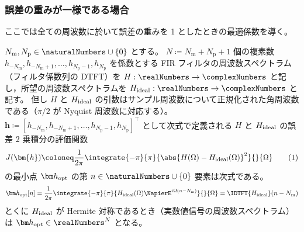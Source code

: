         \subsubsection{誤差の重みが一様である場合}
            \label{誤差の重みが一様である場合}
            \newcommand{\Nm}{{N_\text{m}}}
            \newcommand{\Np}{{N_\text{p}}}
            ここでは全ての周波数に於いて誤差の重みを 1 としたときの最適係数を導く。
            \begin{shadebox}
                $\Nm,\Np\in\naturalNumbers\cup\{0\}$ とする。
                $N\coloneq\Nm+\Np+1$ 個の複素数 $h_{-\Nm},h_{-\Nm+1},\dots,h_{\Np-1},h_\Np$ を係数とする FIR フィルタの周波数スペクトラム（フィルタ係数列の DTFT）を $H:\realNumbers\to\complexNumbers$ と記し，所望の周波数スペクトラムを $\Hideal:\realNumbers\to\complexNumbers$ と記す。
                但し $H$ と $H_\text{ideal}$ の引数はサンプル周波数について正規化された角周波数である（$\pi/2$ が Nyquist 周波数に対応する）。
                $\bm{h} \coloneq [h_{-\Nm},h_{-\Nm+1},\dots,h_{\Np-1},h_\Np]^\top$ として次式で定義される $H$ と $H_\text{ideal}$ の誤差 2 乗積分の評価関数
                \[ J(\bm{h}) \coloneq \frac{1}{2\pi}\integrate{-\pi}{\pi}{\abs{H(\Omega)-\Hideal(\Omega)}^2}{}{\Omega} \tag{1} \]
                の最小点 $\vhOpt$ の第 $n\in\naturalNumbers\cup\{0\}$ 要素は次式である。
                \[ \vhOpt[n] = \frac{1}{2\pi}\integrate{-\pi}{\pi}{\Hideal(\Omega)\NapierE^{i\Omega (n-\Nm)}}{}{\Omega} = \IDTFT{\Hideal}(n-\Nm) \]
                とくに $H_\text{ideal}$ が Hermite 対称であるとき（実数値信号の周波数スペクトラム）は $\vhOpt\in\realNumbers^N$ となる。
            \end{shadebox}
